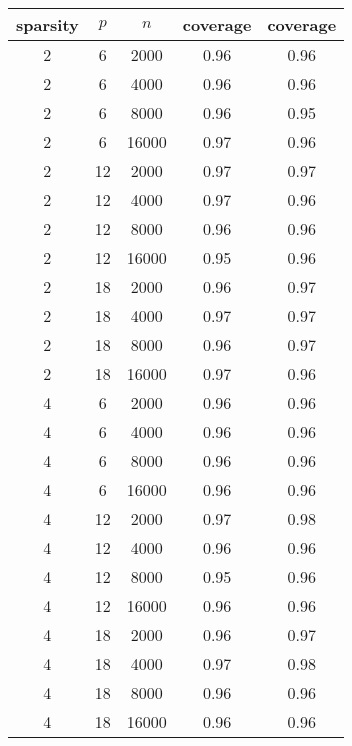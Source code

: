 \begin{table}[ht]
\centering
\begin{tabular}{|ccc|cc|}
  \hline
\hline
sparsity & $p$ & $n$ & coverage & coverage \\ 
  \hline
\hline
2 & 6 & 2000 & 0.96 & 0.96 \\ 
  2 & 6 & 4000 & 0.96 & 0.96 \\ 
  2 & 6 & 8000 & 0.96 & 0.95 \\ 
  2 & 6 & 16000 & 0.97 & 0.96 \\ 
   \hline
2 & 12 & 2000 & 0.97 & 0.97 \\ 
  2 & 12 & 4000 & 0.97 & 0.96 \\ 
  2 & 12 & 8000 & 0.96 & 0.96 \\ 
  2 & 12 & 16000 & 0.95 & 0.96 \\ 
   \hline
2 & 18 & 2000 & 0.96 & 0.97 \\ 
  2 & 18 & 4000 & 0.97 & 0.97 \\ 
  2 & 18 & 8000 & 0.96 & 0.97 \\ 
  2 & 18 & 16000 & 0.97 & 0.96 \\ 
   \hline
\hline
4 & 6 & 2000 & 0.96 & 0.96 \\ 
  4 & 6 & 4000 & 0.96 & 0.96 \\ 
  4 & 6 & 8000 & 0.96 & 0.96 \\ 
  4 & 6 & 16000 & 0.96 & 0.96 \\ 
   \hline
4 & 12 & 2000 & 0.97 & 0.98 \\ 
  4 & 12 & 4000 & 0.96 & 0.96 \\ 
  4 & 12 & 8000 & 0.95 & 0.96 \\ 
  4 & 12 & 16000 & 0.96 & 0.96 \\ 
   \hline
4 & 18 & 2000 & 0.96 & 0.97 \\ 
  4 & 18 & 4000 & 0.97 & 0.98 \\ 
  4 & 18 & 8000 & 0.96 & 0.96 \\ 
  4 & 18 & 16000 & 0.96 & 0.96 \\ 
   \hline
\hline
\end{tabular}
\end{table}
